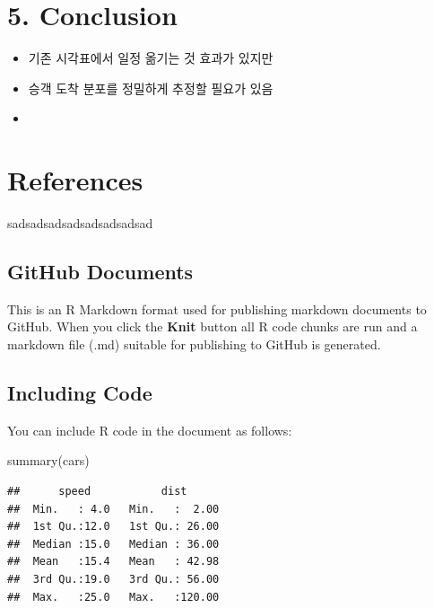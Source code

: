 \documentclass[
]{article}
\newenvironment{Shaded}{\begin{snugshade}}{\end{snugshade}}
\newcommand{\FunctionTok}[1]{\textcolor[rgb]{0.00,0.00,0.00}{#1}}
\newcommand{\NormalTok}[1]{#1}
\begin{document}
\hypertarget{conclusion}{%
\section{5. Conclusion}\label{conclusion}}

\begin{itemize}
\item
  기존 시각표에서 일정 옮기는 것 효과가 있지만
\item
  승객 도착 분포를 정밀하게 추정할 필요가 있음
\item
\end{itemize}

\hypertarget{references}{%
\section{References}\label{references}}

sadsadsadsadsadsadsadsad

\hypertarget{github-documents}{%
\subsection{GitHub Documents}\label{github-documents}}

This is an R Markdown format used for publishing markdown documents to
GitHub. When you click the \textbf{Knit} button all R code chunks are
run and a markdown file (.md) suitable for publishing to GitHub is
generated.

\hypertarget{including-code}{%
\subsection{Including Code}\label{including-code}}

You can include R code in the document as follows:

\begin{Shaded}
\begin{Highlighting}[]
\FunctionTok{summary}\NormalTok{(cars)}
\end{Highlighting}
\end{Shaded}

\begin{verbatim}
##      speed           dist       
##  Min.   : 4.0   Min.   :  2.00  
##  1st Qu.:12.0   1st Qu.: 26.00  
##  Median :15.0   Median : 36.00  
##  Mean   :15.4   Mean   : 42.98  
##  3rd Qu.:19.0   3rd Qu.: 56.00  
##  Max.   :25.0   Max.   :120.00
\end{verbatim}
\end{document}
